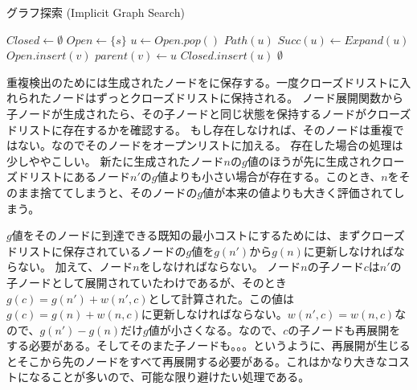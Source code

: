\begin{algorithm}[tb]
\caption{グラフ探索 (Implicit Graph Search)}
\label{alg:implicit-graph-search}
	$Closed \leftarrow \emptyset$\;
	$Open \leftarrow \{s\}$\;
	 {
		$u \leftarrow Open.pop()$\;
		 {
			\Return $Path(u)$\;
		}
		$Succ(u) \leftarrow Expand(u)$\;
		 {
			 {
				$Open.insert(v)$\;
				$parent(v) \leftarrow u$\;
				$Closed.insert(u)$\;
			}
		}
 	}
	\Return $\emptyset$\;
\end{algorithm}


重複検出のためには生成されたノードをに保存する。一度クローズドリストに入れられたノードはずっとクローズドリストに保持される。
ノード展開関数から子ノードが生成されたら、その子ノードと同じ状態を保持するノードがクローズドリストに存在するかを確認する。
もし存在しなければ、そのノードは重複ではない。なのでそのノードをオープンリストに加える。
存在した場合の処理は少しややこしい。
新たに生成されたノード$n$の$g$値のほうが先に生成されクローズドリストにあるノード$n'$の$g$値よりも小さい場合が存在する。このとき、$n$をそのまま捨ててしまうと、そのノードの$g$値が本来の値よりも大きく評価されてしまう。

$g$値をそのノードに到達できる既知の最小コストにするためには、まずクローズドリストに保存されているノードの$g$値を$g(n')$から$g(n)$に更新しなければならない。
加えて、ノード$n$をしなければならない。
ノード$n$の子ノード$c$は$n'$の子ノードとして展開されていたわけであるが、そのとき$g(c) = g(n') + w(n', c)$として計算された。この値は$g(c) = g(n) + w(n, c)$に更新しなければならない。$w(n', c) = w(n, c)$なので、$g(n') - g(n)$だけ$g$値が小さくなる。なので、$c$の子ノードも再展開をする必要がある。そしてそのまた子ノードも。。。というように、再展開が生じるとそこから先のノードをすべて再展開する必要がある。これはかなり大きなコストになることが多いので、可能な限り避けたい処理である。


